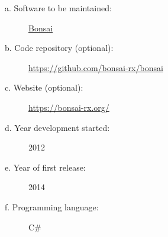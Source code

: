 
\begin{description}

    \item[a. Software to be maintained:] \href{https://bonsai-rx.org/}{Bonsai}

    \item[b. Code repository (optional):] \url{https://github.com/bonsai-rx/bonsai}

    \item[c. Website (optional):] \url{https://bonsai-rx.org/}

    \item[d. Year development started:] 2012

    \item[e. Year of first release:] 2014

    \item[f. Programming language:] C\#

\end{description}

